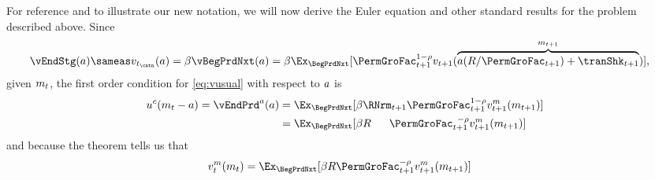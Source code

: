 \documentclass[SolvingMicroDSOPs]{subfiles}
\begin{document}
For reference and to illustrate our new notation, we will now derive the Euler equation and other standard results for the problem described above.
Since
\begin{equation}\begin{gathered}\begin{aligned}
  \vEndStg(\aNrm) & \sameas \vFunc_{\prd_\cntn}(\aNrm) = \DiscFac \vBegPrdNxt(\aNrm) = \DiscFac \Ex_{\BegPrdNxt}[\PermGroFac_{\prd+1}^{1-\CRRA}\vFunc_{\prd+1}(\overbrace{a (\Rfree / \PermGroFac_{\prd+1})+\tranShk_{\prd+1}}^{\mNrm_{\prd+1}})],
\end{aligned}\end{gathered}\end{equation}
given $m_{t}$, the first order condition for \eqref{eq:vusual} with respect to $a$ is
\begin{equation}\begin{gathered}\begin{aligned}
      \uFunc^{\cNrm}(\mNrm_{\prd}-\aNrm) = \vEndPrd^{\aNrm}(a) & = \Ex_{\BegPrdNxt}[\DiscFac \RNrm_{\prd+1}\PermGroFac_{\prd+1}^{1-\CRRA}{\vFunc}^\mNrm_{\prd+1}(\mNrm_{\prd+1})]  \label{eq:upceqEvtp1}
      \\                        & =  \Ex_{\BegPrdNxt}[\DiscFac\Rfree\phantom{._{\prd+1}}\PermGroFac_{\prd+1}^{\phantom{1}-\CRRA}{\vFunc}^{\mNrm}_{\prd+1}(\mNrm_{\prd+1})]
    \end{aligned}\end{gathered}\end{equation}
and because the  theorem tells us that
\begin{equation}\begin{gathered}\begin{aligned}
      {\vFunc}^{\mNrm}_{\prd}(\mNrm_{\prd})  & =  \Ex_{\BegPrdNxt} [\DiscFac \Rfree \PermGroFac_{\prd+1}^{-\CRRA}{\vFunc}^{\mNrm}_{\prd+1}(\mNrm_{\prd+1})] \label{eq:envelope}
    \end{aligned}\end{gathered}\end{equation}
\end{document}

